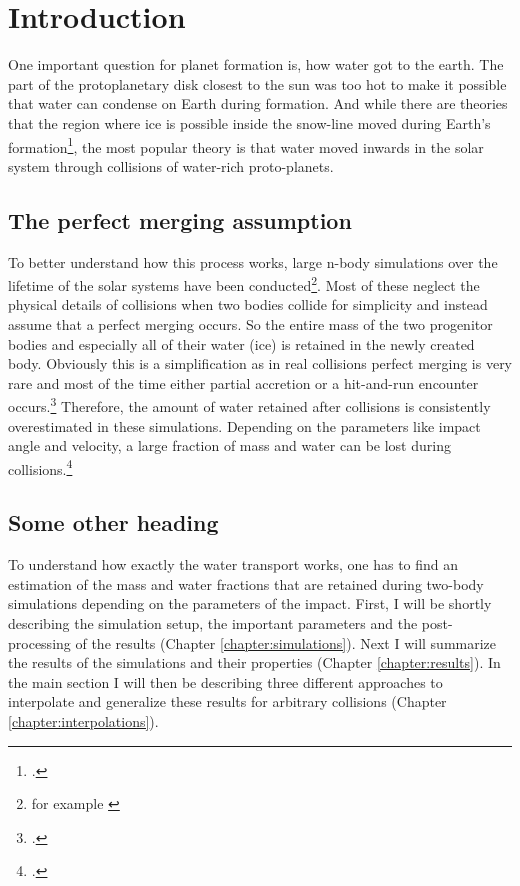 \chapter{Introduction}\label{introduction}

One important question for planet formation is, how water got to the earth. The part of the protoplanetary disk closest to the sun was too hot to make it possible that water can condense on Earth during formation. And while there are theories that the region where ice is possible inside the snow-line moved during Earth's formation\footcite{snowline}, the most popular theory is that water moved inwards in the solar system through collisions of water-rich proto-planets.%


\section{The perfect merging assumption}

To better understand how this process works, large n-body simulations over the lifetime of the solar systems have been conducted\footnote{for example \cite{dvorakSimulation}}. Most of these neglect the physical details of collisions when two bodies collide for simplicity and instead assume that a perfect merging occurs. So the entire mass of the two progenitor bodies and especially all of their water (ice) is retained in the newly created body. Obviously this is a simplification as in real collisions perfect merging is very rare and most of the time either partial accretion or a hit-and-run encounter occurs.\footcite{CollisionTypes} Therefore, the amount of water retained after collisions is consistently overestimated in these simulations. Depending on the parameters like impact angle and velocity, a large fraction of mass and water can be lost during collisions.\footcite{MaindlSummary}

\section{Some other heading}

To understand how exactly the water transport works, one has to find an estimation of the mass and water fractions that are retained during two-body simulations depending on the parameters of the impact.
First, I will be shortly describing the simulation setup, the important parameters and the post-processing of the results (Chapter \ref{chapter:simulations}). Next I will summarize the results of the simulations and their properties (Chapter \ref{chapter:results}). In the main section I will then be describing three different approaches to interpolate and generalize these results for arbitrary collisions (Chapter \ref{chapter:interpolations}). 